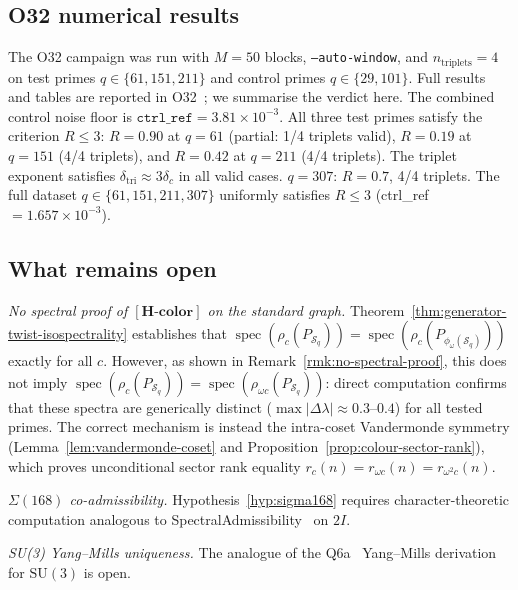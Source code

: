 \documentclass[11pt,a4paper]{article}
\theoremstyle{definition}
\theoremstyle{remark}
\newcommand{\SU}{\mathrm{SU}}
\newcommand{\Hcolor}{\mathbf{[H\text{-}color]}}
\newcommand{\Sq}{\mathcal{S}_q}
\begin{document}
    \subsection{O32 numerical results}
      \label{ssec:o32-results}

      The O32 campaign was run with $M = 50$ blocks, \texttt{--auto-window},
      and $n_{\mathrm{triplets}} = 4$ on test primes $q \in \{61, 151, 211\}$
      and control primes $q \in \{29, 101\}$.
      Full results and tables are reported in O32~\cite{Beau2026a36};
      we summarise the verdict here.
      The combined control noise floor is
      $\mathtt{ctrl\_ref} = 3.81 \times 10^{-3}$.
      All three test primes satisfy the criterion $R \leq 3$:
      $R = 0.90$ at $q = 61$ (partial: 1/4 triplets valid),
      $R = 0.19$ at $q = 151$ (4/4 triplets), and
      $R = 0.42$ at $q = 211$ (4/4 triplets).
      The triplet exponent satisfies $\delta_{\mathrm{tri}} \approx 3\delta_c$ in all valid cases.
      $q=307$: $R=0.7$, 4/4 triplets. The full dataset $q\in\{61,151,211,307\}$
      uniformly satisfies $R\leq 3$ (ctrl\_ref $=1.657\times10^{-3}$).

    \subsection{What remains open}
      \label{ssec:open}

      \emph{No spectral proof of $\Hcolor$ on the standard graph.}
      Theorem~\ref{thm:generator-twist-isospectrality} establishes that
      $\operatorname{spec}(\rho_c(P_{\Sq})) = \operatorname{spec}(\rho_c(P_{\phi_\omega(\Sq)}))$
      exactly for all $c$.
      However, as shown in Remark~\ref{rmk:no-spectral-proof}, this does not imply
      $\operatorname{spec}(\rho_c(P_{\Sq})) = \operatorname{spec}(\rho_{\omega c}(P_{\Sq}))$:
      direct computation confirms that these spectra are generically distinct
      ($\max|\Delta\lambda| \approx 0.3$--$0.4$) for all tested primes.
      The correct mechanism is instead the intra-coset Vandermonde symmetry
      (Lemma~\ref{lem:vandermonde-coset} and Proposition~\ref{prop:colour-sector-rank}),
      which proves unconditional sector rank equality $r_c(n) = r_{\omega c}(n) = r_{\omega^2 c}(n)$.

      \emph{$\Sigma(168)$ co-admissibility.}
      Hypothesis~\ref{hyp:sigma168} requires character-theoretic computation analogous to
      SpectralAdmissibility~\cite{Beau2026a1} on $2I$.

      \emph{SU(3) Yang--Mills uniqueness.}
      The analogue of the Q6a~\cite{Beau2026q6a} Yang--Mills derivation for $\SU(3)$ is open.
\end{document}
